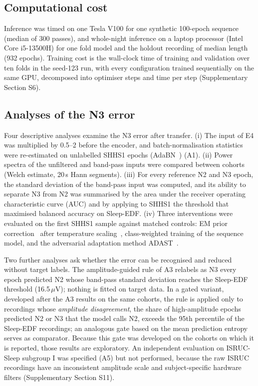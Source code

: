 \documentclass[11pt,a4paper]{article}
\begin{document}
\subsection{Computational cost}

Inference was timed on one Tesla V100 for one synthetic 100-epoch sequence (median of 300 passes),
and whole-night inference on a laptop processor (Intel Core i5-13500H) for one fold model and the
holdout recording of median length (932 epochs). Training cost is the wall-clock time of training and
validation over ten folds in the seed-123 run, with every configuration trained sequentially on the
same GPU, decomposed into optimiser steps and time per step (Supplementary Section S6).

\subsection{Analyses of the N3 error}

Four descriptive analyses examine the N3 error after transfer. (i) The input of E4 was multiplied by
0.5--2 before the encoder, and batch-normalisation statistics were re-estimated on unlabelled SHHS1
epochs (AdaBN~\cite{li2018adabn}) (A1). (ii) Power spectra of the unfiltered and band-pass inputs were
compared between cohorts (Welch estimate, 20\,s Hann segments). (iii) For every reference N2 and N3
epoch, the standard deviation of the band-pass input was computed, and its ability to separate N3
from N2 was summarised by the area under the receiver operating characteristic curve (AUC) and by
applying to SHHS1 the threshold that maximised balanced accuracy on Sleep-EDF. (iv) Three
interventions were evaluated on the first SHHS1 sample against matched controls: EM prior
correction~\cite{saerens2002adjusting} after temperature scaling~\cite{guo2017calibration},
class-weighted training of the sequence model, and the adversarial adaptation method
ADAST~\cite{eldele2023adast}.

Two further analyses ask whether the error can be recognised and reduced without target labels. The
amplitude-guided rule of A3 relabels as N3 every epoch predicted N2 whose band-pass standard deviation
reaches the Sleep-EDF threshold (16.5\,$\mu$V); nothing is fitted on target data. In a gated variant,
developed after the A3 results on the same cohorts, the rule is applied only to recordings whose
\emph{amplitude disagreement}, the share of high-amplitude epochs predicted N2 or N3 that the model
calls N2, exceeds the 95th percentile of the Sleep-EDF recordings; an analogous gate based on the mean
prediction entropy serves as comparator. Because this gate was developed on the cohorts on which it is
reported, those results are exploratory. An independent evaluation on ISRUC-Sleep subgroup I was
specified (A5) but not performed, because the raw ISRUC recordings have an inconsistent amplitude
scale and subject-specific hardware filters (Supplementary Section S11).
\end{document}
